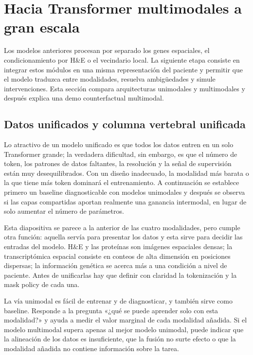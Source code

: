 \section{Hacia Transformer multimodales a gran escala}

Los modelos anteriores procesan por separado los genes espaciales, el condicionamiento por H\&E o el vecindario local. La siguiente etapa consiste en integrar estos módulos en una misma representación del paciente y permitir que el modelo traduzca entre modalidades, resuelva ambigüedades y simule intervenciones. Esta sección compara arquitecturas unimodales y multimodales y después explica una demo counterfactual multimodal.

\subsection{Datos unificados y columna vertebral unificada}

Lo atractivo de un modelo unificado es que todos los datos entren en un solo Transformer grande; la verdadera dificultad, sin embargo, es que el número de token, los patrones de datos faltantes, la resolución y la señal de supervisión están muy desequilibrados. Con un diseño inadecuado, la modalidad más barata o la que tiene más token dominará el entrenamiento. A continuación se establece primero un baseline diagnosticable con modelos unimodales y después se observa si las capas compartidas aportan realmente una ganancia intermodal, en lugar de solo aumentar el número de parámetros.


Esta diapositiva se parece a la anterior de las cuatro modalidades, pero cumple otra función: aquella servía para presentar los datos y esta sirve para decidir las entradas del modelo. H\&E y las proteínas son imágenes espaciales densas; la transcriptómica espacial consiste en conteos de alta dimensión en posiciones dispersas; la información genética se acerca más a una condición a nivel de paciente. Antes de unificarlas hay que definir con claridad la tokenización y la mask policy de cada una.


La vía unimodal es fácil de entrenar y de diagnosticar, y también sirve como baseline. Responde a la pregunta «¿qué se puede aprender solo con esta modalidad?» y ayuda a medir el valor marginal de cada modalidad añadida. Si el modelo multimodal supera apenas al mejor modelo unimodal, puede indicar que la alineación de los datos es insuficiente, que la fusión no surte efecto o que la modalidad añadida no contiene información sobre la tarea.

